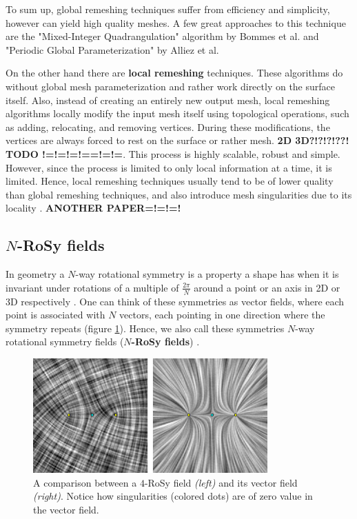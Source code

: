 \documentclass{ACGSeminar}
\begin{document}
To sum up, global remeshing techniques suffer from efficiency and simplicity, however can yield high quality meshes. A few great approaches to this technique are the "Mixed-Integer Quadrangulation" algorithm by Bommes et al. and "Periodic Global Parameterization" by Alliez et al.\bigskip

On the other hand there are \textbf{local remeshing} techniques. These algorithms do without global mesh parameterization and rather work directly on the surface itself. Also, instead of creating an entirely new output mesh, local remeshing algorithms locally modify the input mesh itself using topological operations, such as adding, relocating, and removing vertices. During these modifications, the vertices are always forced to rest on the surface or rather mesh. \textbf{2D 3D?!?!?!??! TODO !=!=!=!==!=!=}. This process is highly scalable, robust and simple. However, since the process is limited to only local information at a time, it is limited. Hence, local remeshing techniques usually tend to be of lower quality than global remeshing techniques, and also introduce mesh singularities due to its locality \cite{jakob2015instant,alliez2008recent}. \textbf{ANOTHER PAPER=!=!=!}


\subsection{$N$-RoSy fields}\label{rosy}
In geometry a $N$-way rotational symmetry is a property a shape has when it is invariant under rotations of a multiple of $\frac{2\pi}{N}$ around a point or an axis in 2D or 3D respectively \cite{palacios2007rotational}. One can think of these symmetries as vector fields, where each point is associated with $N$ vectors, each pointing in one direction where the symmetry repeats (figure \ref{fig:n-rosy-singularities}). Hence, we also call these symmetries $N$-way rotational symmetry fields (\textbf{$N$-RoSy fields}) \cite{panozzo2012fields}.

\begin{figure}[htb!]
	\begin{centering}
		\includegraphics[width=9cm]{img/n-Rosy-Singularity.png}\par
	\end{centering}
	\caption{A comparison between a $4$-RoSy field \textit{(left)} and its vector field \textit{(right)}. Notice how singularities (colored dots) are of zero value in the vector field. \cite{palacios2007rotational}}
	\label{fig:n-rosy-singularities}
\end{figure}
\end{document}
